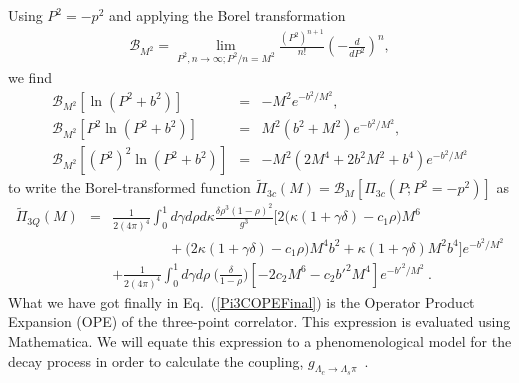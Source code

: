\documentclass[twoside]{article}
\begin{document}
Using $P^2 = - p^2$ and applying the Borel transformation
\begin{eqnarray}
\label{BT}
{\mathcal{B}}_{M^2}  = \lim_{P^2, n \rightarrow \infty; P^2/n = M^2} 
\frac{(P^2)^{n+1}}{n!} \left( - \frac{d}{dP^2} \right)^n,
\end{eqnarray}
we find
\begin{eqnarray}
{\mathcal{B}}_{M^2} \left[  \ln (P^2 + b^2) \right] &=& - M^2 e^{- b^2/M^2}, \\
{\mathcal{B}}_{M^2} \left[ P^2 \ln (P^2 + b^2) \right] &=&  M^2 (b^2 + M^2) 
e^{- b^2/M^2}, \\
{\mathcal{B}}_{M^2} \left[ (P^2)^2 \ln (P^2 + b^2) \right] &=& - M^2 (2M^4 + 2 b^2
 M^2 + b^4) e^{- b^2/M^2}
\end{eqnarray}
to write the Borel-transformed function $\tilde{\Pi}_{3c}(M)=
{\mathcal{B}}_{M}\left[\Pi_{3c}(P; P^2 = -p^2) \right]$ as
\begin{eqnarray}
\label{Pi3COPEFinal}
{\tilde{\Pi}}_{3Q}(M)
&=&
\frac{1}{2(4 \pi)^4} \int_0^1 d \gamma d \rho d \kappa \frac{\delta \rho^3 
(1 - \rho)^2}{g^3} \Big[2\Big( \kappa(1 + \gamma \delta) - c_1 \rho \Big)M^6 
 \nonumber\\
&& \qquad \qquad
+ \Big(2 \kappa(1 + \gamma \delta) - c_1 \rho  \Big) M^4 b^2
+ \kappa (1 + \gamma \delta) M^2 b^4
\Big]e^{- b^2/M^2} \nonumber\\
&&
+\frac{1}{2(4 \pi)^4} \int_0^1 d \gamma d \rho~ \Big(\frac{\delta}{1-\rho}\Big)
 \left[ -2 c_2 M^6 - c_2 {b'}^2 M^4 \right] e^{-{b'}^2/M^2}~.
\end{eqnarray}
What we have got finally in Eq.~(\ref{Pi3COPEFinal}) is the Operator Product 
Expansion (OPE) of the three-point correlator. This expression is evaluated 
using Mathematica. We will equate this expression to a phenomenological model 
for the decay process in order to calculate the coupling, $g_{\Lambda_c 
\rightarrow \Lambda_s \pi}$~.
\end{document}
